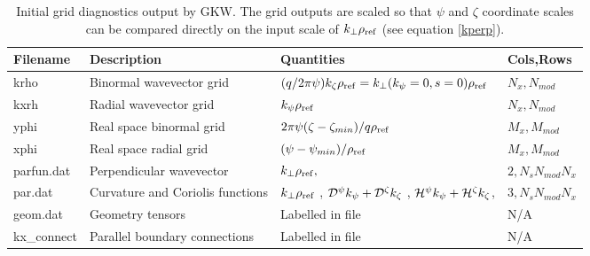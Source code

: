 \documentclass{report}
\begin{document}
\begin{table}[h!]
\begin{tabular}{l|l|l|l}
 Filename & Description & Quantities & Cols,Rows \\
\hline
krho & Binormal wavevector grid & $(q / 2 \pi \psi) k_\zeta \rho_{\rm ref} = k_\perp(k_\psi=0,s=0) \rho_{\rm ref}$ & $N_x, N_{mod}$\\
kxrh & Radial wavevector grid & $k_\psi \rho_{\rm ref}$ & $N_x, N_{mod}$\\
yphi & Real space binormal grid & $ 2 \pi \psi (\zeta-\zeta_{min})/q\rho_{\rm ref}$ & $M_x, M_{mod}$ \\
xphi & Real space radial grid & $(\psi-\psi_{min})/\rho_{\rm ref} $ & $M_x, M_{mod}$ \\
parfun.dat & Perpendicular wavevector & $k_\perp\rho_{\rm ref}, $ & $2,N_s N_{mod} N_x$\\
par.dat & Curvature and Coriolis functions & $k_\perp\rho_{\rm ref}$ , ${\cal D}^\psi k_\psi + {\cal D}^\zeta k_\zeta$ , ${\cal H}^\psi k_\psi + {\cal H}^\zeta k_\zeta$, & $3,N_s N_{mod} N_x$\\
geom.dat & Geometry tensors & Labelled in file & N/A\\
kx\_connect & Parallel boundary connections & Labelled in file & N/A\\
\end{tabular}
\caption{Initial grid diagnostics output by GKW. The grid outputs are scaled so that $\psi$ and $\zeta$ coordinate scales can be compared directly on the input scale of $k_\perp \rho_{\rm ref}$ (see equation \ref{kperp}).} %
\end{table}

\end{document}
